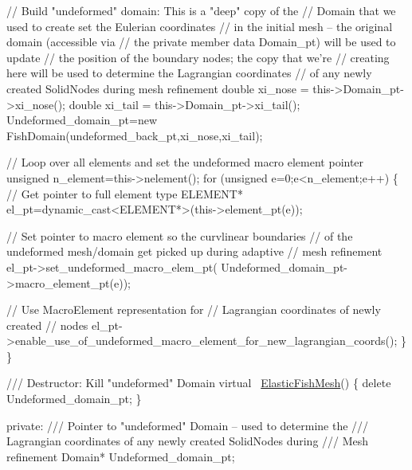 \begin{DoxyCodeInclude}
   \textcolor{comment}{// Build "undeformed" domain: This is a "deep" copy of the}
   \textcolor{comment}{// Domain that we used to create set the Eulerian coordinates}
   \textcolor{comment}{// in the initial mesh -- the original domain (accessible via }
   \textcolor{comment}{// the private member data Domain\_pt) will be used to update}
   \textcolor{comment}{// the position of the boundary nodes; the copy that we're}
   \textcolor{comment}{// creating here will be used to determine the Lagrangian coordinates}
   \textcolor{comment}{// of any newly created SolidNodes during mesh refinement}
   \textcolor{keywordtype}{double} xi\_nose = this->Domain\_pt->xi\_nose(); 
   \textcolor{keywordtype}{double} xi\_tail = this->Domain\_pt->xi\_tail();
   Undeformed\_domain\_pt=\textcolor{keyword}{new} FishDomain(undeformed\_back\_pt,xi\_nose,xi\_tail);

   \textcolor{comment}{// Loop over all elements and set the undeformed macro element pointer}
   \textcolor{keywordtype}{unsigned} n\_element=this->nelement();
   \textcolor{keywordflow}{for} (\textcolor{keywordtype}{unsigned} e=0;e<n\_element;e++)
    \{
     \textcolor{comment}{// Get pointer to full element type }
     ELEMENT* el\_pt=\textcolor{keyword}{dynamic\_cast<}ELEMENT*\textcolor{keyword}{>}(this->element\_pt(e));
     
     \textcolor{comment}{// Set pointer to macro element so the curvlinear boundaries}
     \textcolor{comment}{// of the undeformed mesh/domain get picked up during adaptive}
     \textcolor{comment}{// mesh refinement}
     el\_pt->set\_undeformed\_macro\_elem\_pt(
      Undeformed\_domain\_pt->macro\_element\_pt(e));

     \textcolor{comment}{// Use MacroElement representation for }
     \textcolor{comment}{// Lagrangian coordinates of newly created }
     \textcolor{comment}{// nodes}
     el\_pt->enable\_use\_of\_undeformed\_macro\_element\_for\_new\_lagrangian\_coords();
    \}      
  \}

\textcolor{comment}{}
\textcolor{comment}{ /// Destructor: Kill "undeformed" Domain}
\textcolor{comment}{} \textcolor{keyword}{virtual} ~\hyperlink{classElasticFishMesh}{ElasticFishMesh}()
  \{
   \textcolor{keyword}{delete} Undeformed\_domain\_pt;
  \}


\textcolor{keyword}{private}:
\textcolor{comment}{}
\textcolor{comment}{ /// Pointer to "undeformed" Domain -- used to determine the}
\textcolor{comment}{ /// Lagrangian coordinates of any newly created SolidNodes during}
\textcolor{comment}{ /// Mesh refinement}
\textcolor{comment}{} Domain* Undeformed\_domain\_pt;


\end{DoxyCodeInclude}
